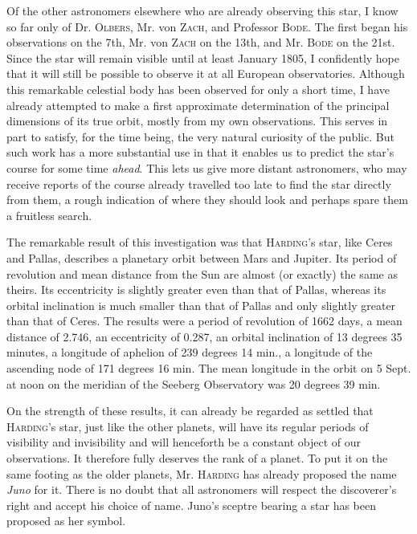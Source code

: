 Of the other astronomers elsewhere who are already observing this star, I know so far only of Dr. \textsc{Olbers}, Mr. von \textsc{Zach}, and Professor \textsc{Bode}. The first began his observations on the 7th, Mr. von \textsc{Zach} on the 13th, and Mr. \textsc{Bode} on the 21st. Since the star will remain visible until at least January 1805, I confidently hope that it will still be possible to observe it at all European observatories. Although this remarkable celestial body has been observed for only a short time, I have already attempted to make a first approximate determination of the principal dimensions of its true orbit, mostly from my own observations. This serves in part to satisfy, for the time being, the very natural curiosity of the public. But such work has a more substantial use in that it enables us to predict the star’s course for some time \emph{ahead}. This lets us give more distant astronomers, who may receive reports of the course already travelled too late to find the star directly from them, a rough indication of where they should look and perhaps spare them a fruitless search.

The remarkable result of this investigation was that \textsc{Harding}’s star, like Ceres and Pallas, describes a planetary orbit between Mars and Jupiter. Its period of revolution and mean distance from the Sun are almost (or exactly) the same as theirs. Its eccentricity is slightly greater even than that of Pallas, whereas its orbital inclination is much smaller than that of Pallas and only slightly greater than that of Ceres. The results were a period of revolution of 1662 days, a mean distance of 2.746, an eccentricity of 0.287, an orbital inclination of 13 degrees 35 minutes, a longitude of aphelion of 239 degrees 14 min., a longitude of the ascending node of 171 degrees 16 min. The mean longitude in the orbit on 5 Sept. at noon on the meridian of the Seeberg Observatory was 20 degrees 39 min.

On the strength of these results, it can already be regarded as settled that \textsc{Harding}’s star, just like the other planets, will have its regular periods of visibility and invisibility and will henceforth be a constant object of our observations. It therefore fully deserves the rank of a planet. To put it on the same footing as the older planets, Mr. \textsc{Harding} has already proposed the name \emph{Juno} for it. There is no doubt that all astronomers will respect the discoverer’s right and accept his choice of name. Juno’s sceptre bearing a star has been proposed as her symbol.

